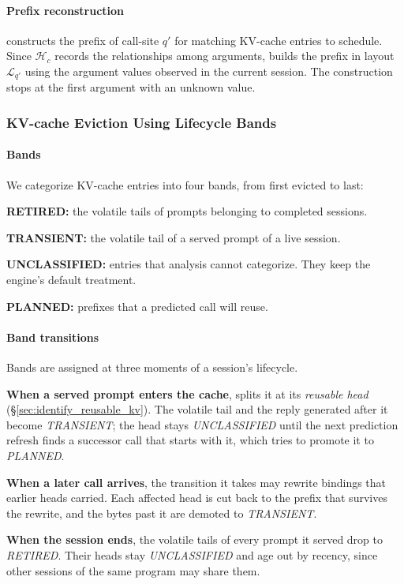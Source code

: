 
\paragraph{Prefix reconstruction}
\sysname constructs the prefix of call-site $q'$ for matching KV-cache entries to schedule. Since $\mathcal{H}_c$ records the relationships among arguments, \sysname builds the prefix in layout $\mathcal{L}_{q'}$ using the argument values observed in the current session. The construction stops at the first argument with an unknown value.


\subsubsection{KV-cache Eviction Using Lifecycle Bands}
\paragraph{Bands}
We categorize KV-cache entries into four bands, from first evicted to last:
\begin{enumerate*}[label=(\arabic*)]
    \item \textbf{RETIRED:} the volatile tails of prompts belonging to completed sessions. 
    \item \textbf{TRANSIENT:} the volatile tail of a served prompt of a live session. 
    \item \textbf{UNCLASSIFIED:} entries that analysis cannot categorize. They keep the engine's default treatment.
    \item \textbf{PLANNED:} prefixes that a predicted call will reuse. 
\end{enumerate*}



\paragraph{Band transitions}
Bands are assigned at three moments of a session's lifecycle.
\begin{enumerate*}[label=(\arabic*)]
    \item \textbf{When a served prompt enters the cache}, \sysname splits it at its \emph{reusable head} (\S\ref{sec:identify_reusable_kv}). The volatile tail and the reply generated after it become \emph{TRANSIENT}; the head stays \emph{UNCLASSIFIED} until the next prediction refresh finds a successor call that starts with it, which tries to promote it to \emph{PLANNED}.
    \item \textbf{When a later call arrives}, the transition it takes may rewrite bindings that earlier heads carried. Each affected head is cut back to the prefix that survives the rewrite, and the bytes past it are demoted to \emph{TRANSIENT}.
    \item \textbf{When the session ends}, the volatile tails of every prompt it served drop to \emph{RETIRED}. Their heads stay \emph{UNCLASSIFIED} and age out by recency, since other sessions of the same program may share them.
\end{enumerate*}

